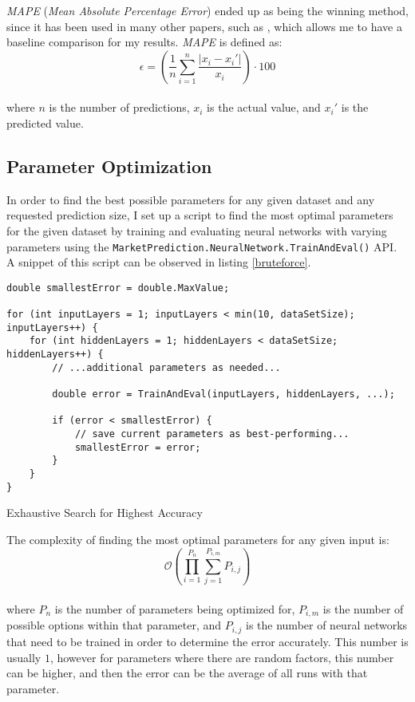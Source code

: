 \documentclass[a4paper,12pt]{article}
\begin{document}
	\textit{MAPE} (\textit{Mean Absolute Percentage Error}) ended up as being the winning method, since it has been used in many other papers, such as \cite{majhi2009efficient}, which allows me to have a baseline comparison for my results. \textit{MAPE} is defined as:\\
	$$ \epsilon = (\frac{1}{n} \sum_{i=1}^{n} \frac{| x_i - x_i' |}{x_i}) \cdot 100 $$\\
	where $n$ is the number of predictions, $x_i$ is the actual value, and $x_i'$ is the predicted value.
	
\subsection{Parameter Optimization} \label{paramopt}
	
	In order to find the best possible parameters for any given dataset and any requested prediction size, I set up a script to find the most optimal parameters for the given dataset by training and evaluating neural networks with varying parameters using the \texttt{MarketPrediction.NeuralNetwork.TrainAndEval()} API. A snippet of this script can be observed in listing \ref{bruteforce}.
	
	\begin{listing}[!htbp]
		\begin{verbatim}
double smallestError = double.MaxValue;

for (int inputLayers = 1; inputLayers < min(10, dataSetSize); inputLayers++) {
	for (int hiddenLayers = 1; hiddenLayers < dataSetSize; hiddenLayers++) {
		// ...additional parameters as needed...
		
		double error = TrainAndEval(inputLayers, hiddenLayers, ...);
		
		if (error < smallestError) {
			// save current parameters as best-performing...
			smallestError = error;
		}
	}
}
		\end{verbatim}
		\caption{Exhaustive Search for Highest Accuracy}
		\label{bruteforce}
	\end{listing}
	
\newpage
	The complexity of finding the most optimal parameters for any given input is:\\
	$$ \mathcal{O}(\prod_{i=1}^{P_n} \sum_{j=1}^{P_{i,m}} P_{i,j}) $$\\
	where $P_n$ is the number of parameters being optimized for, $P_{i,m}$ is the number of possible options within that parameter, and $P_{i,j}$ is the number of neural networks that need to be trained in order to determine the error accurately. This number is usually $1$, however for parameters where there are random factors, this number can be higher, and then the error can be the average of all runs with that parameter.
	
\end{document}
